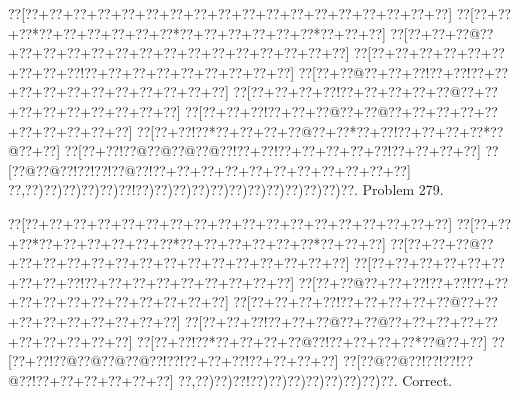 \documentclass[a5paper]{article}
\begin{document}
\begin{center}
{\goo
\0??[\0??+\0??+\0??+\0??+\0??+\0??+\0??+\0??+\0??+\0??+\0??+\0??+\0??+\0??+\0??+\0??+\0??+\0??]
\0??[\0??+\0??+\0??*\0??+\0??+\0??+\0??+\0??+\0??*\0??+\0??+\0??+\0??+\0??+\0??*\0??+\0??+\0??]
\0??[\0??+\0??+\0??@\0??+\0??+\0??+\0??+\0??+\0??+\0??+\0??+\0??+\0??+\0??+\0??+\0??+\0??+\0??]
\0??[\0??+\0??+\0??+\0??+\0??+\0??+\0??+\0??+\0??!\0??+\0??+\0??+\0??+\0??+\0??+\0??+\0??+\0??]
\0??[\0??+\0??@\0??+\0??+\0??!\0??+\0??!\0??+\0??+\0??+\0??+\0??+\0??+\0??+\0??+\0??+\0??+\0??]
\0??[\0??+\0??+\0??+\0??!\0??+\0??+\0??+\0??+\0??@\0??+\0??+\0??+\0??+\0??+\0??+\0??+\0??+\0??]
\0??[\0??+\0??+\0??!\0??+\0??+\0??@\0??+\0??@\0??+\0??+\0??+\0??+\0??+\0??+\0??+\0??+\0??+\0??]
\0??[\0??+\0??!\0??*\0??+\0??+\0??+\0??@\0??+\0??*\0??+\0??!\0??+\0??+\0??+\0??*\0??@\0??+\0??]
\0??[\0??+\0??!\0??@\0??@\0??@\0??@\0??!\0??+\0??!\0??+\0??+\0??+\0??+\0??!\0??+\0??+\0??+\0??]
\0??[\0??@\0??@\0??!\0??!\0??!\0??@\0??!\0??+\0??+\0??+\0??+\0??+\0??+\0??+\0??+\0??+\0??+\0??]
\0??,\0??)\0??)\0??)\0??)\0??)\0??!\0??)\0??)\0??)\0??)\0??)\0??)\0??)\0??)\0??)\0??)\0??)\0??.
}
Problem 279.

\end{center}
\begin{center}
{\goo
\0??[\0??+\0??+\0??+\0??+\0??+\0??+\0??+\0??+\0??+\0??+\0??+\0??+\0??+\0??+\0??+\0??+\0??+\0??]
\0??[\0??+\0??+\0??*\0??+\0??+\0??+\0??+\0??+\0??*\0??+\0??+\0??+\0??+\0??+\0??*\0??+\0??+\0??]
\0??[\0??+\0??+\0??@\0??+\0??+\0??+\0??+\0??+\0??+\0??+\0??+\0??+\0??+\0??+\0??+\0??+\0??+\0??]
\0??[\0??+\0??+\0??+\0??+\0??+\0??+\0??+\0??+\0??!\0??+\0??+\0??+\0??+\0??+\0??+\0??+\0??+\0??]
\0??[\0??+\0??@\0??+\0??+\0??!\0??+\0??!\0??+\0??+\0??+\0??+\0??+\0??+\0??+\0??+\0??+\0??+\0??]
\0??[\0??+\0??+\0??+\0??!\0??+\0??+\0??+\0??+\0??@\0??+\0??+\0??+\0??+\0??+\0??+\0??+\0??+\0??]
\0??[\0??+\0??+\0??!\0??+\0??+\0??@\0??+\0??@\0??+\0??+\0??+\0??+\0??+\0??+\0??+\0??+\0??+\0??]
\0??[\0??+\0??!\0??*\0??+\0??+\0??+\0??@\0??!\0??+\0??+\0??+\0??*\0??@\0??+\0??]
\0??[\0??+\0??!\0??@\0??@\0??@\0??@\0??!\0??!\0??+\0??+\0??!\0??+\0??+\0??+\0??]
\0??[\0??@\0??@\0??!\0??!\0??!\0??@\0??!\0??+\0??+\0??+\0??+\0??+\0??]
\0??,\0??)\0??)\0??!\0??)\0??)\0??)\0??)\0??)\0??)\0??)\0??.
}
Correct. 

\end{center}
\end{document}

